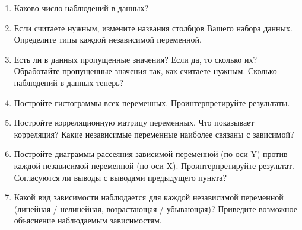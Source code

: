 \documentclass[11pt, a4paper]{extarticle}
\begin{document}
\begin{enumerate}
	\item Каково число наблюдений в данных? 
	\item Если считаете нужным, измените названия столбцов Вашего набора данных. Определите типы каждой независимой переменной.  
	\item Есть ли в данных пропущенные значения? Если да, то сколько их? Обработайте пропущенные значения так, как считаете нужным. Сколько наблюдений в данных теперь?
	\item Постройте гистограммы всех переменных. Проинтерпретируйте результаты.
	\item Постройте корреляционную матрицу переменных. Что показывает корреляция? Какие независимые переменные наиболее связаны с зависимой? 
	\item Постройте диаграммы рассеяния зависимой переменной (по оси Y) против каждой независимой переменной (по оси X). Проинтерпретируйте результат. Согласуются ли выводы с выводами предыдущего пункта? 
	\item Какой вид зависимости наблюдается для каждой независимой переменной (линейная / нелинейная, возрастающая / убывающая)? Приведите возможное объяснение наблюдаемым зависимостям.
\end{enumerate}
\end{document}
